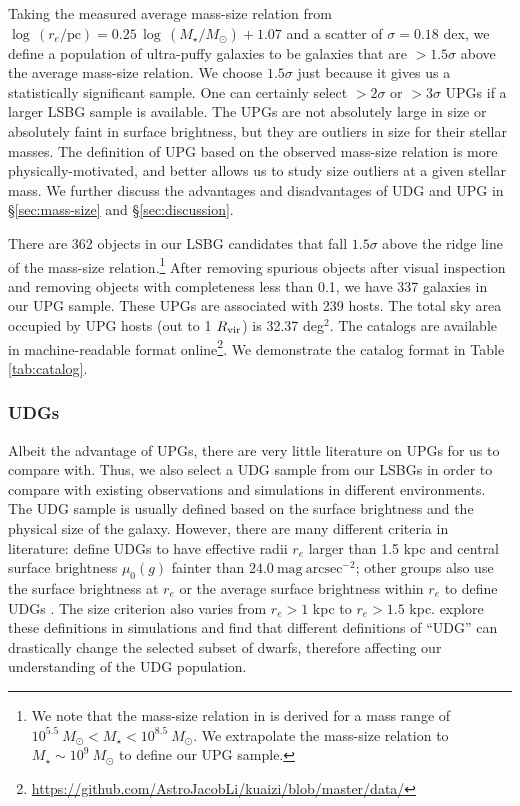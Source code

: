 \documentclass[twocolumn,astrosymb,twocolappendix]{aastex631}
\newcommand{\sbunit}{\mathrm{mag\ arcsec}^{-2}}
\begin{document}
\begin{CJK*}{UTF8}{gbsn}
Taking the measured average mass-size relation from \citet{ELVES-I} $\log\, (r_e/\mathrm{pc}) = 0.25\, \log\, (M_\star/M_\odot) + 1.07$ and a scatter of $\sigma=0.18$ dex, we define a population of ultra-puffy galaxies to be galaxies that are $>1.5\sigma$ above the average mass-size relation. We choose $1.5\sigma$ just because it gives us a statistically significant sample. One can certainly select $>2\sigma$ or $>3\sigma$ UPGs if a larger LSBG sample is available. The UPGs are not absolutely large in size or absolutely faint in surface brightness, but they are outliers in size for their stellar masses. The definition of UPG based on the observed mass-size relation is more physically-motivated, and better allows us to study size outliers at a given stellar mass. We further discuss the advantages and disadvantages of UDG and UPG in \S\ref{sec:mass-size} and \S\ref{sec:discussion}.

There are 362 objects in our LSBG candidates that fall $1.5\sigma$ above the ridge line of the mass-size relation.\footnote{We note that the mass-size relation in \citet{ELVES-I} is derived for a mass range of $10^{5.5}\ M_\odot < M_\star < 10^{8.5}\ M_\odot$. We extrapolate the mass-size relation to $M_\star \sim 10^9\ M_\odot$ to define our UPG sample.} After removing spurious objects after visual inspection and removing objects with completeness less than 0.1, we have 337 galaxies in our UPG sample. These UPGs are associated with 239 hosts. The total sky area occupied by UPG hosts (out to 1 $R_{\rm{vir}}$) is 32.37 deg$^{2}$. The catalogs are available in machine-readable format online\footnote{\url{https://github.com/AstroJacobLi/kuaizi/blob/master/data/}}. We demonstrate the catalog format in Table \ref{tab:catalog}. 

\subsubsection{UDGs}
Albeit the advantage of UPGs, there are very little literature on UPGs for us to compare with. Thus, we also select a UDG sample from our LSBGs in order to compare with existing observations and simulations in different environments. The UDG sample is usually defined based on the surface brightness and the physical size of the galaxy. However, there are many different criteria in literature: \citet{vanDokkum2015} define UDGs to have effective radii $r_e$ larger than 1.5 kpc and central surface brightness $\mu_0(g)$ fainter than $24.0\ \sbunit$; other groups also use the surface brightness at $r_e$ \citep[e.g.,][]{DiCintio2017,Cardona-Barrero2020} or the average surface brightness within $r_e$ to define UDGs \citep[e.g.,][]{Koda2015,Yagi2016,vdBurg2016,Leisman2017,Martin2019}. The size criterion also varies from $r_e > 1$ kpc to $r_e > 1.5$ kpc. \citet{vanNest2022} explore these definitions in simulations and find that different definitions of ``UDG'' can drastically change the selected subset of dwarfs, therefore affecting our understanding of the UDG population.


\end{CJK*}
\end{document}

